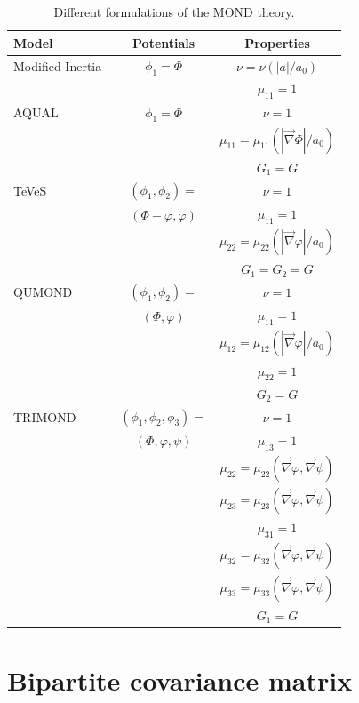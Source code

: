 \documentclass[aps,prl,reprint,superscriptaddress,nofootinbib,floatfix]{revtex4-2}
\begin{document}
\begin{table}
\centering
\caption{Different formulations of the MOND theory.}
\begin{tabular}{ l|c|c }
\toprule
  Model & Potentials & Properties \\
\midrule\midrule
  Modified Inertia~\cite{MOND-Milgrom1992}	& $\phi_1 = \Phi$ & 
	$\nu=\nu(|a|/a_{0})$ 	\\
&	&	$\mu_{11}=1$
\\	\midrule
  AQUAL~\cite{Lag4MOND-Bekenstein1984} & $\phi_1 = \Phi$	& 
$\nu=1$	\\
&	&	$\mu_{11}=\mu_{11}(|\vec{\nabla}\Phi|/a_{0})$ \\
& & $G_{1}=G$
\\	\midrule
  TeVeS~\cite{TeVeS-Bekenstein2004} & $(\phi_1, \phi_2) = $ &	
	$\nu=1$				\\
& $(\Phi - \varphi,\varphi)$	&	$\mu_{11} = 1$	\\
&	&	$\mu_{22} =\mu_{22}(|\vec{\nabla}\varphi|/a_{0})$
\\	
& & $G_{1}=G_{2}=G$\\
\midrule
  QUMOND ~\cite{MOND-QLinear-Milgrom2009} & $(\phi_1,\phi_2) = $ &
	$\nu=1$				\\
& $(\Phi,\varphi)$	&	$\mu_{11} = 1$	\\
&	&	$\mu_{12} =\mu_{12}(|\vec{\nabla}\varphi|/a_{0})$	\\
&	&	$\mu_{22} = 1$	\\
&	&	$G_{2}=G$
\\	\midrule
  TRIMOND ~\cite{Milgrom:2023idw} & $(\phi_1,\phi_2,\phi_3) =$ &
	$\nu=1$				\\
& $(\Phi,\varphi,\psi)$	&	$\mu_{13} = 1$	\\
&	&	$\mu_{22} =\mu_{22}(\vec{\nabla}\varphi,\vec{\nabla}\psi)$	\\
&	&	$\mu_{23} =\mu_{23}(\vec{\nabla}\varphi,\vec{\nabla}\psi)$	\\
&	&	$\mu_{31} = 1$	\\
&	&	$\mu_{32} =\mu_{32}(\vec{\nabla}\varphi,\vec{\nabla}\psi)$	\\
&	&	$\mu_{33} =\mu_{33}(\vec{\nabla}\varphi,\vec{\nabla}\psi)$	\\
&	&	$G_{1}=G$ 		
\\  \bottomrule
\end{tabular}
\label{tab:ManyMOND}
\end{table}



\section{Bipartite covariance matrix}
\end{document}
